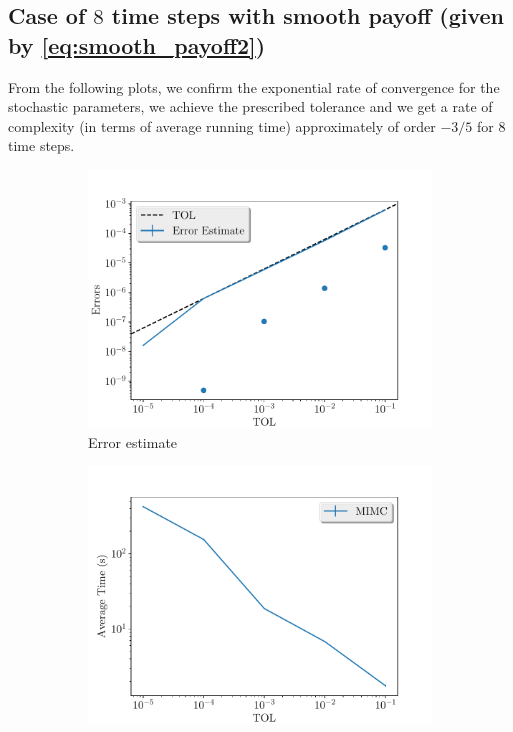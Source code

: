 \documentclass[11pt]{article}
\begin{document}
\subsection{Case of $8$ time steps with smooth payoff (given by \eqref{eq:smooth_payoff2})}

From the following plots, we confirm the exponential rate of convergence for the stochastic parameters, we achieve the prescribed tolerance and  we get a rate of complexity (in terms of average running time) approximately of order $-3/5$ for $8$ time steps.

\begin{figure}[!h]
	\centering
	\begin{subfigure}{.5\textwidth}
		\centering
		\includegraphics[width=1\linewidth]{./figures/1D_BS_8_steps_smooth_second_payoff_eps_10_5/error_estimate.pdf}
		\caption{Error estimate}
		\label{fig:misc_1D_BS_8_steps_smooth_second_payoff_eps_10_5_sub1}
	\end{subfigure}%
	\begin{subfigure}{.5\textwidth}
		\centering
		\includegraphics[width=1\linewidth]{./figures/1D_BS_8_steps_smooth_second_payoff_eps_10_5/average_running_time.pdf}

\end{subfigure}
\end{figure}
\end{document}
